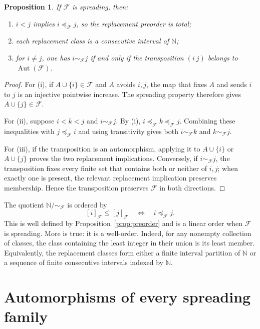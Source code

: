 \documentclass[11pt]{article}
\newtheorem{proposition}[theorem]{Proposition}
\theoremstyle{definition}
\theoremstyle{remark}
\newcommand{\N}{\mathbb N}
\newcommand{\F}{\mathcal F}
\newcommand{\Aut}{\operatorname{Aut}}
\begin{document}
\begin{proposition}\label{prop:spreading-structure}
If $\F$ is spreading, then:
\begin{enumerate}[label=\textup{(\roman*)},leftmargin=2.2em]
  \item $i<j$ implies $i\preccurlyeq_{\F}j$, so the replacement preorder is
        total;
  \item each replacement class is a consecutive interval of $\N$;
  \item for $i\ne j$, one has $i\sim_{\F}j$ if and only if the transposition
        $(i\ j)$ belongs to $\Aut(\F)$.
\end{enumerate}
\end{proposition}

\begin{proof}
For (i), if $A\cup\{i\}\in\F$ and $A$ avoids $i,j$, the map that fixes $A$
and sends $i$ to $j$ is an injective pointwise increase.  The spreading
property therefore gives $A\cup\{j\}\in\F$.

For (ii), suppose $i<k<j$ and $i\sim_{\F}j$.  By (i),
$i\preccurlyeq_{\F}k\preccurlyeq_{\F}j$.  Combining these inequalities with
$j\preccurlyeq_{\F}i$ and using transitivity gives both
$i\sim_{\F}k$ and $k\sim_{\F}j$.

For (iii), if the transposition is an automorphism, applying it to
$A\cup\{i\}$ or $A\cup\{j\}$ proves the two replacement implications.
Conversely, if $i\sim_{\F}j$, the transposition fixes every finite set that
contains both or neither of $i,j$; when exactly one is present, the relevant
replacement implication preserves membership.  Hence the transposition
preserves $\F$ in both directions.
\end{proof}

The quotient $\N/{\sim_{\F}}$ is ordered by
\[
  [i]_{\F}\le [j]_{\F}
  \quad\Longleftrightarrow\quad i\preccurlyeq_{\F}j.
  \tag{2.3}\label{eq:quotient-order}
\]
This is well defined by Proposition~\ref{prop:preorder} and is a linear order
when $\F$ is spreading.  More is true: it is a well-order.  Indeed, for any
nonempty collection of classes, the class containing the least integer in
their union is its least member.  Equivalently, the replacement classes form
either a finite interval partition of $\N$ or a sequence of finite consecutive
intervals indexed by $\N$.

\section{Automorphisms of every spreading family}
\end{document}
